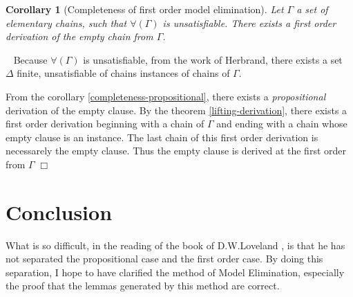 \documentclass{article}
\newtheorem{corollaire}[theoreme]{Corollary}
\newenvironment{preuve}{\noindent {\em Proof :}\ }{{\hfill
    $\Box$}\vspace{.5pc}} \newcommand{\sg}{\!\!<\!\!}
\begin{document}
\begin{corollaire}[Completeness of first order model elimination]
Let $\Gamma$ a set of elementary chains, such that $\forall(\Gamma)$ is unsatisfiable. There exists a first order derivation
of the empty chain from $\Gamma$.
\end{corollaire}

\begin{preuve}
Because $\forall(\Gamma)$ is unsatisfiable, from the work of Herbrand, there exists a set $\Delta$ finite, unsatisfiable of
chains instances of chains of $\Gamma$.

From the corollary \ref{completeness-propositional}, there exists a \emph{propositional} derivation of the empty clause.
By the theorem \ref{lifting-derivation}, there exists a first order derivation beginning with a chain of $\Gamma$
and ending with a chain whose empty clause is an instance. The last chain of this first order derivation is necessarely the
empty clause. Thus the empty clause is derived at the first order from $\Gamma$
\end{preuve}


\section*{Conclusion}
What is so difficult, in the reading of the book of D.W.Loveland \cite{Loveland1997}, is that he has not separated the 
propositional case and the first order case. By doing this separation, I hope to have clarified the method of Model 
Elimination, especially the proof that the lemmas generated by this method are correct.










\end{document}
